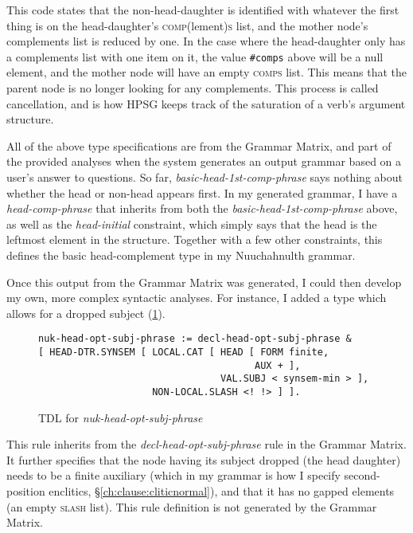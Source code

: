 \vspace{-5pt}

This code states that the non-head-daughter is identified with whatever the first thing is on the head-daughter's \textsc{comp}(lement)\textsc{s} list, and the mother node's complements list is reduced by one. In the case where the head-daughter only has a complements list with one item on it, the value \texttt{\#comps} above will be a null element, and the mother node will have an empty \textsc{comps} list. This means that the parent node is no longer looking for any complements. This process is called cancellation, and is how HPSG keeps track of the saturation of a verb's argument structure.

All of the above type specifications are from the Grammar Matrix, and part of the provided analyses when the system generates an output grammar based on a user's answer to questions. So far, \textit{\justify basic-head-1st-comp-phrase} says nothing about whether the head or non-head appears first. In my generated grammar, I have a \textit{head-comp-phrase} that inherits from both the \textit{\justify basic-head-1st-comp-phrase} above, as well as the \textit{head-initial} constraint, which simply says that the head is the leftmost element in the structure. Together with a few other constraints, this defines the basic head-complement type in my Nuuchahnulth grammar.

Once this output from the Grammar Matrix was generated, I could then develop my own, more complex syntactic analyses. For instance, I added a type which allows for a dropped subject (\cref{figure:nuk-head-opt-subj-phrase}).

\begin{figure}[H]
\caption{TDL for \textit{nuk-head-opt-subj-phrase}}
\label{figure:nuk-head-opt-subj-phrase}
\begin{verbatim}
nuk-head-opt-subj-phrase := decl-head-opt-subj-phrase &
[ HEAD-DTR.SYNSEM [ LOCAL.CAT [ HEAD [ FORM finite,
                                      AUX + ],
                                VAL.SUBJ < synsem-min > ],
                    NON-LOCAL.SLASH <! !> ] ].
\end{verbatim}
\end{figure}

\vspace{-5pt}

\noindent This rule inherits from the \textit{decl-head-opt-subj-phrase} rule in the Grammar Matrix. It further specifies that the node having its subject dropped (the head daughter) needs to be a finite auxiliary (which in my grammar is how I specify second-position enclitics, \S\ref{ch:clause:cliticnormal}), and that it has no gapped elements (an empty \textsc{slash} list). This rule definition is not generated by the Grammar Matrix.

